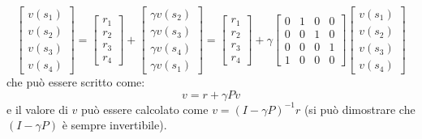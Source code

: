 \begin{equation}\begin{bmatrix}
    v(s_1)\\v(s_2)\\v(s_3)\\v(s_4)
\end{bmatrix}=\begin{bmatrix}
    r_1\\r_2\\r_3\\r_4
\end{bmatrix}+
\begin{bmatrix}
    \gamma v(s_2)\\\gamma v(s_3)\\\gamma v(s_4)\\\gamma v(s_1)
\end{bmatrix}=\begin{bmatrix}
    r_1\\r_2\\r_3\\r_4
\end{bmatrix}+\gamma
\begin{bmatrix}
    0&1&0&0\\0&0&1&0\\0&0&0&1\\1&0&0&0
\end{bmatrix}\begin{bmatrix}
    v(s_1)\\v(s_2)\\v(s_3)\\v(s_4)
\end{bmatrix}\end{equation}
che può essere scritto come:
\begin{equation}v=r+\gamma Pv\end{equation}
e il valore di $v$ può essere calcolato come $v=(I-\gamma P)^{-1}r$ (si può dimostrare che $(I-\gamma P)$ è sempre invertibile).


